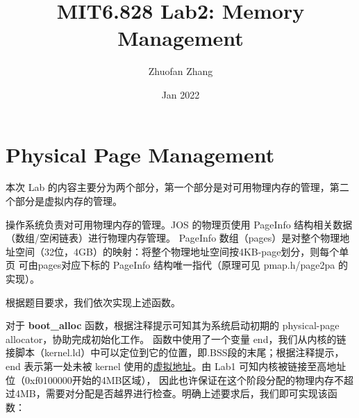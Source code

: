 \documentclass[12pt, letterpaper]{report}
\title{MIT6.828 Lab2: Memory Management}
\author{Zhuofan Zhang}
\date{Jan 2022}
\begin{document}
\maketitle
\renewcommand\contentsname{\Huge Contents}
\tableofcontents{}


\newpage
{}
\chapter[\Large Physical Page Management]{Physical Page Management}
本次 Lab 的内容主要分为两个部分，第一个部分是对可用物理内存的管理，第二个部分是虚拟内存的管理。\par
操作系统负责对可用物理内存的管理。JOS 的物理页使用 PageInfo 结构相关数据（数组/空闲链表）进行物理内存管理。
PageInfo 数组（pages）是对整个物理地址空间（32位，4GB）的映射：将整个物理地址空间按4KB-page划分，则每个单页
可由pages对应下标的 PageInfo 结构唯一指代（原理可见 pmap.h/page2pa 的实现）。\par 
\quad \par 
{}
根据题目要求，我们依次实现上述函数。\par 
对于 \textbf{boot\_alloc} 函数，根据注释提示可知其为系统启动初期的 physical-page allocator，协助完成初始化工作。
函数中使用了一个变量 end，我们从内核的链接脚本（kernel.ld）中可以定位到它的位置，即.BSS段的末尾；根据注释提示，
end 表示第一处未被 kernel 使用的\underline{虚拟地址}。由 Lab1 可知内核被链接至高地址位（0xf0100000开始的4MB区域），
因此也许保证在这个阶段分配的物理内存不超过4MB，需要对分配是否越界进行检查。明确上述要求后，我们即可实现该函数：
\newpage
\end{document}
